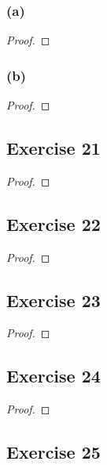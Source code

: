 \documentclass[14pt]{extarticle}
\begin{document}
\subsubsection{(a)}

\begin{proof}

\end{proof}

\subsubsection{(b)}

\begin{proof}

\end{proof}

\subsection{Exercise 21}

\begin{proof}

\end{proof}

\subsection{Exercise 22}

\begin{proof}

\end{proof}

\subsection{Exercise 23}

\begin{proof}

\end{proof}

\subsection{Exercise 24}

\begin{proof}

\end{proof}

\subsection{Exercise 25}
\end{document}
